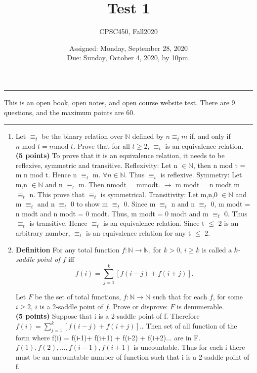 \documentclass{article}
\title{Test 1}
\author{CPSC450, Fall2020}
\date{Assigned: Monday, September 28, 2020\\
Due: Sunday, October 4, 2020, by 10pm.}
\newcommand{\nat}{\mathbb{N}}
\begin{document}
\maketitle 
\hrule
\medskip
This is an open book, open notes, and open course website test. There
are 9 questions, and the maximum points are 60.
\medskip
\hrule
\medskip

\begin{enumerate} 

\item Let $\equiv_t$ be the binary relation over $\nat$
  defined by $n \equiv_t m$ if, and only if $n \mbox{ mod } t = m \mbox{
    mod } t$. Prove that for all $t \geq 2$, $\equiv_t$ is an
  equivalence relation.\\
  \phantom{junk}\hfill{\textbf{(5 points)}}
  \newline To prove that it is an equivalence relation, it needs to be reflexive, symmetric and transitive.
  \newline Reflexivity: Let n $\in \nat$, then n mod t = m n mod t. Hence n $\equiv_t$ m. $\forall n \in \nat$. Thus $\equiv_t$ is reflexive.
  \newline Symmetry: Let m,n $\in \nat$ and n $\equiv_t$ m. Then nmodt = mmodt.
  \newline $\rightarrow$ m modt = n modt
  \newline m $\equiv_t$ n.
  \newline This prove that $\equiv_t$ is symmetrical.
  \newline Transitivity: Let m,n,0 $\in \nat$ and m $\equiv_t$ and n $\equiv_t$ 0 to show m $\equiv_t$ 0. Since m $\equiv_t$ n and n $\equiv_t$ 0, m modt = n modt and n modt = 0 modt. Thus, m modt = 0 modt and m $\equiv_t$ 0. Thus $\equiv_t$ is transitive.
  \newline Hence $\equiv_t$ is an equivalence relation. Since t $\leq$ 2 is an arbitrary number, $\equiv_t$ is an equivalence relation for any t $\leq$ 2.

\item \textbf{Definition} For any total function $f: \nat \to \nat$,
  for $k > 0$,
    $i \geq k$ is called a \emph{$k$-saddle point of $f$} iff
    \[
    f(i) = \sum_{j=1}^k [f(i-j) + f(i+j)].
    \]

    Let $F$ be the set of total functions, $f: \nat \to \nat$ such
    that for each $f$, for some $i \geq 2$, $i$
    is a 2-saddle
    point of $f$.
    Prove or disprove: $F$ is denumerable.\\
    \phantom{junk}\hfill{\textbf{(5 points)}}
    \newline Suppose that i is a 2-saddle point of f. Therefore $f(i) = \sum_{j=1}^k [f(i-j) + f(i+j)].$. Then set of all function of the form where f(i) = f(i-1)+ f(i+1) + f(i-2) + f(i+2)... are in F. ${f(1), f(2),...,f(i-1),f(i+1)}$ is uncountable. Thus for each i there must be an uncountable number of function such that i is a 2-saddle point of f.


\end{enumerate}
\end{document}
